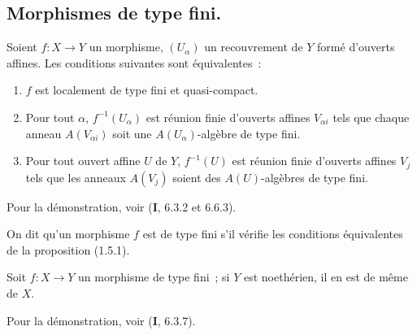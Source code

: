 \subsection{Morphismes de type fini.}
\label{subsection:IV.1.5-fr}

\begin{proposition}[1.5.1]
\label{IV.1.5.1-fr}
Soient $f:X\to Y$ un morphisme, $(U_\alpha)$ un recouvrement de $Y$ formé
d'ouverts affines. Les conditions suivantes sont équivalentes~:
\begin{enumerate}
  \item[\textup{a)}] $f$ est localement de type fini et quasi-compact.
  \item[\textup{b)}] Pour tout $\alpha$, $f^{-1}(U_\alpha)$ est réunion finie d'ouverts
  affines $V_{\alpha i}$ tels que chaque anneau $A(V_{\alpha i})$ soit une
  $A(U_\alpha)$-algèbre de type fini.
  \item[\textup{c)}] Pour tout ouvert affine $U$ de $Y$, $f^{-1}(U)$ est réunion finie
  d'ouverts affines $V_j$ tels que les anneaux $A(V_j)$ soient des
  $A(U)$-algèbres de type fini.
\end{enumerate}
\end{proposition}

Pour la démonstration, voir (\textbf{I}, 6.3.2 et 6.6.3).

\begin{definition}[1.5.2]
\label{IV.1.5.2-fr}
On dit qu'un morphisme $f$ est de type fini s'il vérifie les conditions
équivalentes de la proposition \textup{(1.5.1)}.
\end{definition}


\begin{proposition}[1.5.3]
\label{IV.1.5.3-fr}
Soit $f:X\to Y$ un morphisme de type fini~; si $Y$ est noethérien, il en est
de même de $X$.
\end{proposition}

Pour la démonstration, voir (\textbf{I}, 6.3.7).

